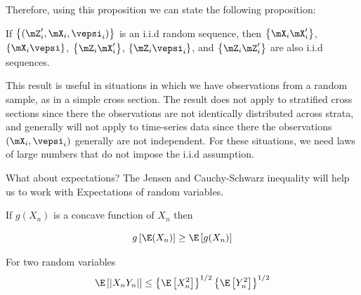 Therefore, using this proposition we can state the following proposition:

\begin{proposition}\label{proposition:iid_transf}
	If $\left\{(\mZ'_i,\mX_i,\vepsi_i)\right\}$ is an i.i.d random sequence, then $\left\{\mX_i\mX_i'\right\}$, $\left\{\mX_i\vepsi\right\}$, $\left\{\mZ_i\mX_i'\right\}$, $\left\{\mZ_i\vepsi_i\right\}$, and $\left\{\mZ_i\mZ_i'\right\}$ are also i.i.d sequences. 
\end{proposition}

This result is useful in situations in which we have observations from a random sample, as in a simple cross section. The result does not apply to stratified cross sections since there the observations are not identically distributed across strata, and generally will not apply to time-series data since there the observations $(\mX_i, \vepsi_i)$ generally are not independent. For these situations, we need laws of large numbers that do not  impose the i.i.d assumption.

What about expectations? The Jensen and Cauchy-Schwarz inequality will help us to work with Expectations of random variables. 

\begin{theorem}\label{theorem:Jansen-Inequality}
If $g(X_n)$ is a concave function of $X_n$ then

\begin{equation*}
  g\left[\E(X_n)\right] \geq \E\left[g(X_n)\right]
\end{equation*}
\end{theorem}

\begin{theorem}\label{theorem:Cauchy-Inequality}
For two random variables
\begin{equation*}
  \E\left[\left|X_nY_n\right|\right]\leq \left\lbrace \E\left[X_n^2\right]\right\rbrace^{1/2} \left\lbrace \E\left[Y_n^2\right]\right\rbrace^{1/2} 
\end{equation*}
\end{theorem}




